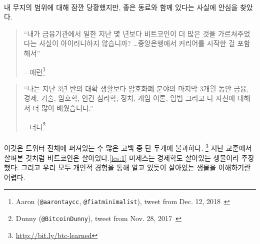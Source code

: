 
\paragraph{}
내 무지의 범위에 대해 잠깐 당황했지만, 좋은 동료와 함께 있다는 사실에 안심을 찾았다.

\begin{quotation}\begin{samepage}
		\enquote{내가 금융기관에서 일한 지난 몇 년보다 비트코인이 더 많은 것을 가르쳐주었다는 사실이 
			아이러니하지 않습니까? \ldots 중앙은행에서 커리어를 시작한 걸 포함해서}
		\begin{flushright} -- 애런\footnote{Aaron (\texttt{@aarontaycc}, \texttt{@fiatminimalist}), tweet from Dec.
				12, 2018~\cite{aarontaycc-tweet}}
\end{flushright}\end{samepage}\end{quotation}

\begin{quotation}\begin{samepage}
		\enquote{나는 지난 3년 반의 대확 생활보다 암호화폐 분야의 마지막 3개월 동안 
		금융, 경제, 기술, 암호학, 인간 심리학, 정치, 게임 이론, 입법 그리고 나 자신에 대해서 더 많이 배웠습니다.}
		\begin{flushright} -- 더니\footnote{Dunny (\texttt{@BitcoinDunny}), tweet from Nov. 28,
				2017~\cite{bitcoindunny-tweet}}
\end{flushright}\end{samepage}\end{quotation}

\paragraph{}
이것은 트위터 전체에 퍼져있는 수 많은 고백 중 단 두개에 불과하다. \footnote{\url{http://bit.ly/btc-learned}} 
지난 교훈에서 살펴본 것처럼 비트코인은 살아있다.\ref{les:1}
미제스는 경제학도 살아있는 생물이라 주장했다. 
그리고 우리 모두 개인적 경험을 통해 알고 있듯이 살아있는 생물을 이해하기란 어렵다.

